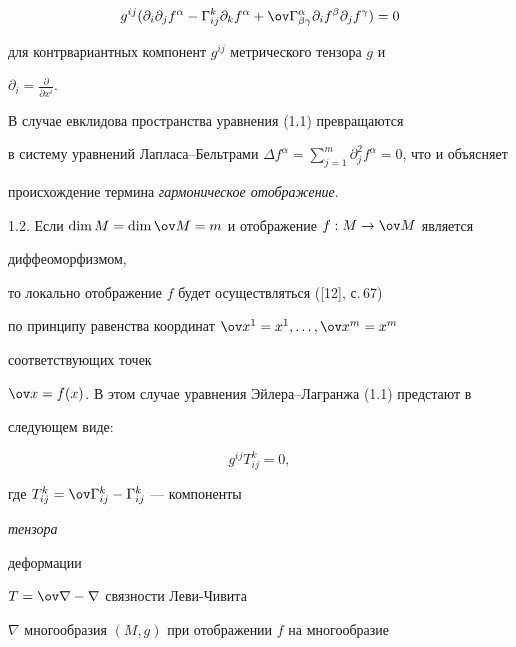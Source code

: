 \begin{equation} 


g^{ij}(\partial_i\partial_j f^\alpha-\Gamma^k_{ij} 


\partial_k f^\alpha+\ov\Gamma^\alpha_{\beta\gamma} 


\partial_i f^\beta\partial_j f^\gamma)=0 


\end{equation} 


для контрвариантных компонент $g^{ij}$ метрического тензора $g$ и 


$\partial_i=\frac{\partial}{\partial x^i}$. 


 


\begin{notes} 


В случае евклидова пространства уравнения (1.1) превращаются 


в систему уравнений Лапласа--Бельтрами $\Delta 


f^\alpha=\sum\limits^m_{j=1} \partial^2_j f^\alpha=0$, что и объясняет 


происхождение термина {\it гармоническое отображение}. 


\end{notes} 


 


1.2. Если $\dim M=\dim\ov M=m$ и отображение $f:M\to\ov M$ является 


диффеоморфизмом, 


то локально отображение $f$ будет осуществляться ([12], с.\,67) 


по принципу равенства координат $\ov x^1=x^1,\dotsc,\ov x^m=x^m$ 


соответствующих точек 


$\ov x=f(x)$. В этом случае уравнения Эйлера--Лагранжа (1.1) предстают в 


следующем виде: 


\begin{equation} 


g^{ij}T^k_{ij}=0, 


\end{equation} 


где $T^k_{ij}=\ov\Gamma^k_{ij}-\Gamma^k_{ij}$ --- компоненты {\it тензора 


деформации} $T=\ov\nabla-\nabla$ связности Леви-Чивита 


$\nabla$ многообразия $(M,g)$ при отображении $f$ на многообразие 


